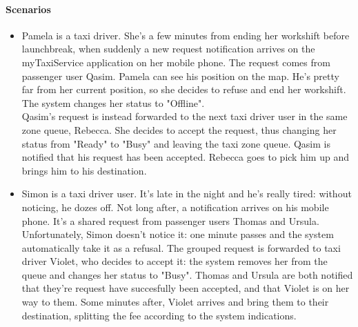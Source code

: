 \paragraph{Scenarios}
		\begin{itemize}
			\item Pamela is a taxi driver. She's a few minutes from ending her workshift before launchbreak, when suddenly a new request notification arrives on the myTaxiService application on her mobile phone. The request comes from passenger user Qasim. Pamela can see his position on the map. He's pretty far from her current position, so she decides to refuse and end her workshift. The system changes her status to "Offline".\\
			Qasim's request is instead forwarded to the next taxi driver user in the same zone queue, Rebecca. She decides to accept the request, thus changing her status from "Ready" to "Busy" and leaving the taxi zone queue. Qasim is notified that his request has been accepted. Rebecca goes to pick him up and brings him to his destination.
			
			\item Simon is a taxi driver user. It's late in the night and he's really tired: without noticing, he dozes off. Not long after, a notification arrives on his mobile phone. It's a shared request from passenger users Thomas and Ursula. Unfortunately, Simon doesn't notice it: one minute passes and the system automatically take it as a refusal. The grouped request is forwarded to taxi driver Violet, who decides to accept it: the system removes her from the queue and changes her status to "Busy". Thomas and Ursula are both notified that they're request have succesfully been accepted, and that Violet is on her way to them. Some minutes after, Violet arrives and bring them to their destination, splitting the fee according to the system indications.
		\end{itemize}
		
